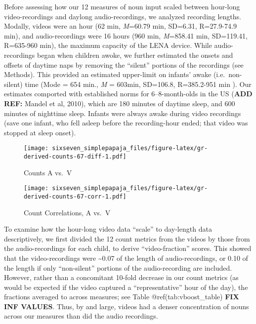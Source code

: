 \documentclass[floatsintext,man]{apa6}
\theoremstyle{definition}
\theoremstyle{definition}
\theoremstyle{definition}
\theoremstyle{remark}
\begin{document}
Before assessing how our 12 measures of noun input scaled between
hour-long video-recordings and daylong audio-recordings, we analyzed
recording lengths. Modally, videos were an hour (62 min, \emph{M}=60.79
min, SD=6.31, R=27.9-74.9 min), and audio-recordings were 16 hours (960
min, \emph{M}=858.41 min, SD=119.41, R=635-960 min), the maximum
capacity of the LENA device. While audio-recordings began when children
awoke, we further estimated the onsets and offsets of daytime naps by
removing the \enquote{silent} portions of the recordings (see Methods).
This provided an estimated upper-limit on infants' awake
(i.e.~non-silent) time (Mode = 654 min., \emph{M} = 603min, SD=106.8,
R=385.2-951 min ). Our estimates comported with established norms for
6--8-month-olds in the US (\textbf{ADD REF:} Mandel et al, 2010), which
are 180 minutes of daytime sleep, and 600 minutes of nighttime sleep.
Infants were always awake during video recordings (save one infant, who
fell asleep before the recording-hour ended; that video was stopped at
sleep onset).

\begin{figure}
\centering
\texttt{[image: sixseven\_simplepapaja\_files/figure-latex/gr-derived-counts-67-diff-1.pdf]}
\caption{\label{fig:gr-derived-counts-67-diff}Counts A vs.~V}
\end{figure}

\begin{figure}
\centering
\texttt{[image: sixseven\_simplepapaja\_files/figure-latex/gr-derived-counts-67-corr-1.pdf]}
\caption{\label{fig:gr-derived-counts-67-corr}Count Correlations, A vs.~V}
\end{figure}

To examine how the hour-long video data \enquote{scale} to day-length
data descriptively, we first divided the 12 count metrics from the
videos by those from the audio-recordings for each child, to derive
\enquote{video-fraction} scores. This showed that the video-recordings
were \textasciitilde{}0.07 of the length of audio-recordings, or 0.10 of
the length if only \enquote{non-silent} portions of the audio-recording
are included. However, rather than a concomitant 10-fold decrease in our
count metrics (as would be expected if the video captured a
\enquote{representative} hour of the day), the fractions averaged to
across measures; see Table @ref(tab:vboost\_table) \textbf{FIX INF
VALUES}. Thus, by and large, videos had a denser concentration of nouns
across our measures than did the audio recordings.
\end{document}
